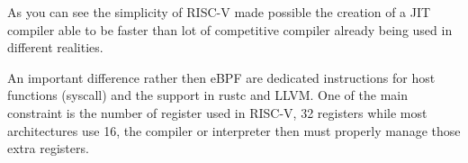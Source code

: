 \documentclass[../main.tex]{subfiles}
\begin{document}
As you can see the simplicity of RISC-V made possible the creation of a JIT compiler able to be faster than lot of competitive compiler already being used in different realities.

An important difference rather then eBPF are dedicated instructions for host functions (syscall) and the support in rustc and LLVM. One of the main constraint is the number of register used in RISC-V, 32 registers while most architectures use 16, the compiler or interpreter then must properly manage those extra registers.
\end{document}
